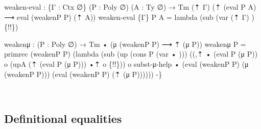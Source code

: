 {\begin{code}
{weaken{-}eval : \{Γ : Ctx ∅\} (P : Poly ∅) (A : Ty ∅)
  → Tm (⇡ Γ) (⇡ (eval P A) ⟶ eval (weakenP P) (⇡ A))
weaken{-}eval \{Γ\} P A = lambda (sub (var (⇡ Γ) \AgdaUnderscore{}) \{!!\})

weakenμ : (P : Poly ∅) → Tm • (μ (weakenP P) ⟶ ⇡ (μ P))
weakenμ P =
  primrec (weakenP P)
          (lambda (sub (up (cons P (var • \AgdaUnderscore{})))
                         ((,⇡ • (eval P (μ P)) o
                           (upA (⇡ (eval P (μ P))) •⇡ o
                           \{!!\})) o
                           subst{-}μ{-}help • (eval (weakenP P) (μ (weakenP P))) (eval (weakenP P) (⇡ (μ P))))))
{-}\}}\<%
\\
\>[0]\AgdaSpace{}%
\AgdaSpace{}%
\AgdaSpace{}%
\<%
\end{code}
}

\subsection{Definitional equalities}
\label{sec:defeq}

